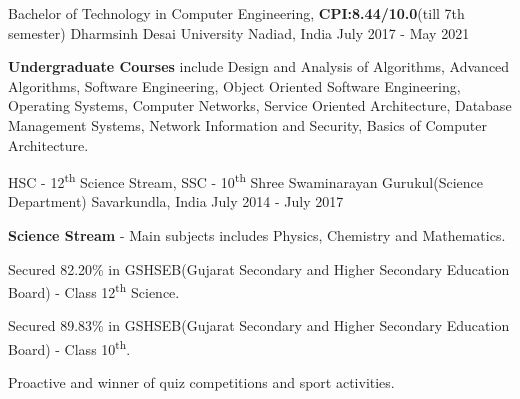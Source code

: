 
\begin{cventries}
  \cventry
    {Bachelor of Technology in Computer Engineering, \textbf{CPI:8.44/10.0}(till 7th semester)} %
    {Dharmsinh Desai University} %
    {Nadiad, India} %
    {July 2017 - May 2021} %
    {
      \begin{cvitems} %
         \item {\textbf{Undergraduate Courses} include Design and Analysis of Algorithms, Advanced Algorithms, Software Engineering, Object Oriented
Software Engineering, Operating Systems, Computer Networks, Service Oriented Architecture, Database Management Systems,
Network Information and Security, Basics of Computer Architecture.}
         \vspace{0.5mm}
      \end{cvitems}
    }
    
\end{cventries}
\begin{cventries}
  \cventry
    {HSC - 12\textsuperscript{th} Science Stream, SSC - 10\textsuperscript{th}} %
    {Shree Swaminarayan Gurukul(Science Department)} %
    {Savarkundla, India} %
    {July 2014 - July 2017} %
    {
      \begin{cvitems} %
         \item {\textbf{Science Stream} -  Main subjects includes Physics, Chemistry and Mathematics.}
         \vspace{0.5mm}
          \item {Secured 82.20\% in GSHSEB(Gujarat Secondary and Higher Secondary Education Board) - Class 12\textsuperscript{th} Science.}
          \vspace{0.5mm}
          \item {Secured 89.83\% in GSHSEB(Gujarat Secondary and Higher Secondary Education Board) - Class 10\textsuperscript{th}.}
          \vspace{0.5mm}
          \item {Proactive and winner of quiz competitions and sport activities.}
          \vspace{0.5mm}
      \end{cvitems}
    }
    
\end{cventries}
